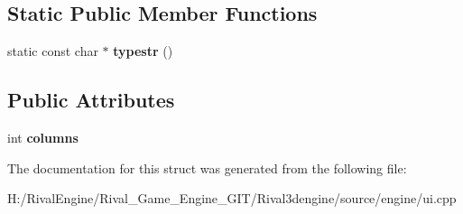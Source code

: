 \subsection*{Static Public Member Functions}
\begin{DoxyCompactItemize}
\item 
\mbox{\label{struct_u_i_1_1_table_header_a79397579f848409ce2c0296472ad4e00}} 
static const char $\ast$ {\bfseries typestr} ()
\end{DoxyCompactItemize}
\subsection*{Public Attributes}
\begin{DoxyCompactItemize}
\item 
\mbox{\label{struct_u_i_1_1_table_header_a06694aa65edce6abb5262da8b4789fdf}} 
int {\bfseries columns}
\end{DoxyCompactItemize}


The documentation for this struct was generated from the following file\+:\begin{DoxyCompactItemize}
\item 
H\+:/\+Rival\+Engine/\+Rival\+\_\+\+Game\+\_\+\+Engine\+\_\+\+G\+I\+T/\+Rival3dengine/source/engine/ui.\+cpp\end{DoxyCompactItemize}
